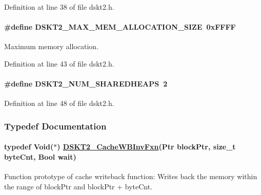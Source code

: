 Definition at line 38 of file dskt2.h.\hypertarget{group___d_s_p_d_s_k_t2_gb7906673f1c60a08206bd37c7f7d1178}{
\paragraph[DSKT2\_\-MAX\_\-MEM\_\-ALLOCATION\_\-SIZE]{\setlength{\rightskip}{0pt plus 5cm}\#define DSKT2\_\-MAX\_\-MEM\_\-ALLOCATION\_\-SIZE~0x\-FFFF}\hfill}
\label{group___d_s_p_d_s_k_t2_gb7906673f1c60a08206bd37c7f7d1178}


Maximum memory allocation. 

Definition at line 43 of file dskt2.h.\hypertarget{group___d_s_p_d_s_k_t2_gcb5e98129cb03f61436195c9fd240804}{
\paragraph[DSKT2\_\-NUM\_\-SHAREDHEAPS]{\setlength{\rightskip}{0pt plus 5cm}\#define DSKT2\_\-NUM\_\-SHAREDHEAPS~2}\hfill}
\label{group___d_s_p_d_s_k_t2_gcb5e98129cb03f61436195c9fd240804}




Definition at line 48 of file dskt2.h.

\subsubsection{Typedef Documentation}
\hypertarget{group___d_s_p_d_s_k_t2_gc2be66a39e491bc30ef6f01d7a0a4361}{
\paragraph[DSKT2\_\-CacheWBInvFxn]{\setlength{\rightskip}{0pt plus 5cm}typedef Void($\ast$) \hyperlink{group___d_s_p_d_s_k_t2_gc2be66a39e491bc30ef6f01d7a0a4361}{DSKT2\_\-Cache\-WBInv\-Fxn}(Ptr block\-Ptr, size\_\-t byte\-Cnt, Bool wait)}\hfill}
\label{group___d_s_p_d_s_k_t2_gc2be66a39e491bc30ef6f01d7a0a4361}


Function prototype of cache writeback function: Writes back the memory within the range of block\-Ptr and block\-Ptr + byte\-Cnt. 


